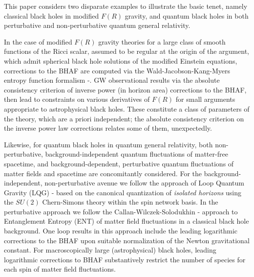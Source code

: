 \documentclass[11pt]{article}
\begin{document}
This paper considers two disparate examples to illustrate the basic tenet, namely classical black holes in modified $F(R)$ gravity, and quantum black holes in both perturbative and non-perturbative quantum general relativity. 

In the case of modified $F(R)$ gravity theories for a large class of smooth functions of the Ricci scalar, assumed to be regular at the origin of the argument, which admit spherical black hole solutions of the modified Einstein equations, corrections to the BHAF are computed \cite{dmm2026} via the Wald-Jacobson-Kang-Myers entropy function formalism \cite{rmw1992}-\cite{jkm1994}. GW observational results via the absolute consistency criterion of inverse power (in horizon area) corrections to the BHAF, then lead to constraints on various derivatives of $F(R)$ for small arguments appropriate to astrophysical black holes. These constitute a class of parameters of the theory, which are a priori independent; the absolute consistency criterion on the inverse power law corrections relates some of them, unexpectedly. 

Likewise, for quantum black holes in quantum general relativity, both non-perturbative, background-independent quantum fluctuations of matter-free spacetime, and background-dependent, perturbative quantum fluctuations of matter fields and spacetime are concomitantly considered. For the background-independent, non-perturbative avenue we follow the approach of Loop Quantum Gravity (LQG) \cite{km98}-\cite{abhi-pm14} based on the canonical quantization of {\it isolated horizons} using the $SU(2)$ Chern-Simons theory within the spin network basis. In the perturbative approach we follow the Callan-Wilczek-Solodukhin \cite{cal1994}-\cite{sol2020} approach to Entanglement Entropy (ENT) of matter field fluctuations in a classical black hole background. One loop results in this approach include the leading logarithmic corrections to the BHAF upon suitable normalization of the Newton gravitational constant. For macroscopically large (astrophysical) black holes, leading logarithmic corrections to BHAF substantively restrict the number of species for each spin of matter field fluctuations. 
\end{document}
